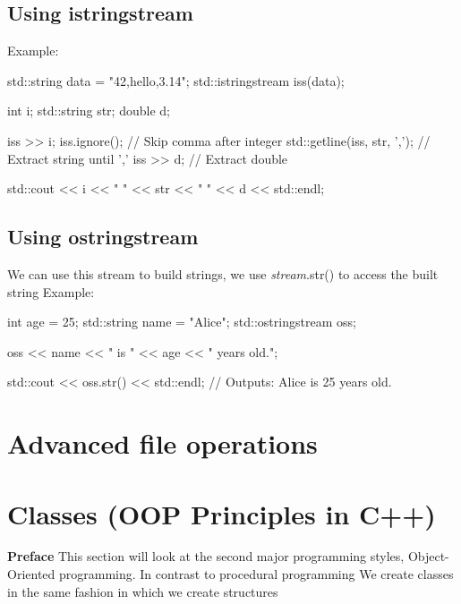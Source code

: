 \documentclass{report}
\begin{document}
     \bigbreak \noindent 
     \subsection{Using istringstream}
     \bigbreak \noindent 
     Example:
     \bigbreak \noindent 
     
     \begin{cppcode}
std::string data = "42,hello,3.14";
std::istringstream iss(data);

int i;
std::string str;
double d;

iss >> i;
iss.ignore(); // Skip comma after integer
std::getline(iss, str, ','); // Extract string until ','
iss >> d;                    // Extract double

std::cout << i << " " << str << " " << d << std::endl;
     \end{cppcode}
     

     \bigbreak \noindent 
     \subsection{Using ostringstream}
     \bigbreak \noindent 
     We can use this stream to build strings, we use \textit{stream}.str() to access the built string
     \bigbreak \noindent 
     Example:
     \bigbreak \noindent 
     
     \begin{cppcode}
int age = 25;
std::string name = "Alice";
std::ostringstream oss;

oss << name << " is " << age << " years old.";

std::cout << oss.str() << std::endl; // Outputs: Alice is 25 years old.
     \end{cppcode}
     

    \pagebreak \bigbreak \noindent 
    \section{\LARGE Advanced file operations}
    \bigbreak \noindent 

    \pagebreak \bigbreak \noindent 
    \section{\LARGE Classes (OOP Principles in C++)}
    \bigbreak \noindent 
    \textbf{Preface} This section will look at the second major programming styles, Object-Oriented programming. In contrast to procedural programming
    \bigbreak \noindent 
    We create classes in the same fashion in which we create structures
    \bigbreak \noindent 
    
\end{document}
